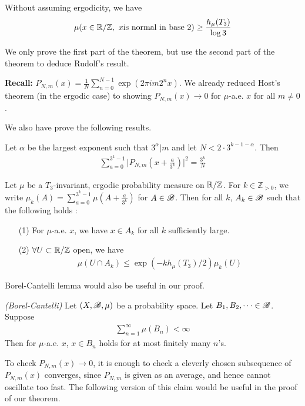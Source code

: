 \documentclass[12pt,a4paper]{report}
\begin{document}
\quad Without assuming ergodicity, we have
\begin{align*}
\mu(x \in \mathbb{R}/\mathbb{Z},\,\, x \text{is normal in base 2})\geq \frac{h_{\mu}(T_3)}{\log 3}
\end{align*}
\s

We only prove the first part of the theorem, but use the second part of the theorem to deduce Rudolf's result.
\s

\textbf{Recall: } $P_{N,m}(x) = \frac{1}{N}\sum_{n=0}^{N-1} \exp(2\pi i m2^n x)$. We already reduced Host's theorem (in the ergodic case) to showing $P_{N,m}(x) \rightarrow 0$ for $\mu$-a.e. $x$ for all $m\neq 0$.

\quad We also have prove the following results.
\s

 Let $\alpha$ be the largest exponent such that $3^{\alpha} | m$ and let $N< 2\cdot 3^{k-1-\alpha}$. Then
\begin{align*}
\sum_{a=0}^{3^k -1} \Big| P_{N,m}(x+ \frac{a}{3^k}) \Big|^2 = \frac{3^k}{N}
\end{align*}
\s

\cor Let $\mu$ be a $T_3$-invariant, ergodic probability measure on $\mathbb{R}/\mathbb{Z}$. For $k \in \mathbb{Z}_{>0}$, we write $\mu_k(A) = \sum_{a=0}^{3^k-1} \mu(A + \frac{a}{3^k})$ for $A \in \mathscr{B}$. Then for all $k$, $A_k \in \mathscr{B}$ such that the following holds :
\begin{itemize}
\item[(1)] For $\mu$-a.e. $x$, we have $x\in A_k$ for all $k$ sufficiently large.
\item[(2)] $\forall U \subset \mathbb{R}/ \mathbb{Z}$ open, we have
\begin{align*}
\mu(U \cap A_k) \leq \exp(-k h_{\mu}(T_3)/2) \mu_k(U)
\end{align*}
\end{itemize}
\s

Borel-Cantelli lemma would also be useful in our proof.
\s

\lem \emph{(Borel-Cantelli)} Let $(X, \mathscr{B}, \mu)$ be a probability space. Let $B_1, B_2, \cdots \in \mathscr{B}$. Suppose 
\begin{align*}
\sum_{n=1}^{\infty} \mu(B_n) < \infty
\end{align*}
Then for $\mu$-a.e. $x$, $x\in B_n$ holds for at most finitely many $n$'s.
\s

To check $P_{N,m}(x) \rightarrow 0$, it is enough to check a cleverly chosen subsequence of $P_{N,m}(x)$ converges, since $P_{N,m}$ is given as an average, and hence cannot oscillate too fast. The following version of this claim would be useful in the proof of our theorem.
\s
\end{document}
